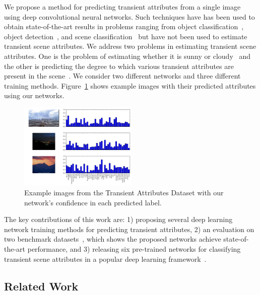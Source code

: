 \documentclass{article}
\newcommand{\figref}[1]{Figure~\ref{fig:#1}}
\begin{document}

We propose a method for predicting transient attributes from a single
image using deep convolutional neural networks. Such techniques have
has been used to obtain state-of-the-art results in problems ranging
from object classification~\cite{krizhevsky2012imagenet}, object
detection~\cite{girshick2013rich}, and scene
classification~\cite{zhou2014places} but have not been used to
estimate transient scene attributes. We address two problems in
estimating transient scene attributes. One is the problem of
estimating whether it is sunny or cloudy~\cite{lutwoclass} and the
other is predicting the degree to which various transient attributes
are present in the scene~\cite{Laffont14}. We consider two different 
networks and three different training methods. \figref{results} shows example
images with their predicted attributes using our networks.


\begin{figure}
	\centering
		\includegraphics[width=0.5\textwidth]{figs/bars.pdf}
		\caption{Example images from the Transient Attributes Dataset
      with our network's confidence in each predicted label.}
    \label{fig:results}
\end{figure}


The key contributions of this work are: 1) proposing several
deep learning network training methods for predicting transient
attributes, 2) an evaluation on two benchmark
datasets~\cite{lutwoclass,Laffont14}, which shows the proposed
networks achieve state-of-the-art performance, and 3) releasing six
pre-trained networks for classifying transient scene attributes
in a popular deep learning framework~\cite{caffe14}. 

\subsection{Related Work}
\indent
\end{document}

